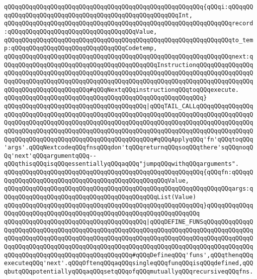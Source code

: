 \verb|qQQqqQQqqQQqqQQqqQQqqQQqqQQqqQQqqQQqqQQqqQQqqQQqqQQqqQQq{qQQqi:qQQqqQQqqQQqqQQqqQQqqQQqqQQqqQQqqQQqqQQqqQQqqQQqqQQqqQQqInt,|\newline
\verb|qQQqqQQqqQQqqQQqqQQqqQQqqQQqqQQqqQQqqQQqqQQqqQQqqQQqqQQqqQQqqQQqrecord:qQQqqQQqqQQqqQQqqQQqqQQqqQQqqQQqqQQqValue,|\newline
\verb|qQQqqQQqqQQqqQQqqQQqqQQqqQQqqQQqqQQqqQQqqQQqqQQqqQQqqQQqqQQqqQQqto_temp:qQQqqQQqqQQqqQQqqQQqqQQqqQQqqQQqCodetemp,|\newline
\verb|qQQqqQQqqQQqqQQqqQQqqQQqqQQqqQQqqQQqqQQqqQQqqQQqqQQqqQQqqQQqqQQqnext:qQQqqQQqqQQqqQQqqQQqqQQqqQQqqQQqqQQqqQQqqQQqInstructionqQQqqQQqqQQqqQQqqQQqqQQqqQQqqQQqqQQqqQQqqQQqqQQqqQQqqQQqqQQqqQQqqQQqqQQqqQQqqQQqqQQqqQQqqQQqqQQqqQQqqQQqqQQqqQQqqQQqqQQqqQQqqQQqqQQqqQQqqQQqqQQqqQQqqQQqqQQqqQQqqQQqqQQqqQQqqQQqqQQq#qQQqNextqQQqinstructionqQQqtoqQQqexecute.|\newline
\verb|qQQqqQQqqQQqqQQqqQQqqQQqqQQqqQQqqQQqqQQqqQQqqQQqqQQqqQQq}|\newline
\newline
\verb|qQQqqQQqqQQqqQQqqQQqqQQqqQQqqQQqqQQqqQQq|\verb#|qQQqTAIL_CALLqQQqqQQqqQQqqQQqqQQqqQQqqQQqqQQqqQQqqQQqqQQqqQQqqQQqqQQqqQQqqQQqqQQqqQQqqQQqqQQqqQQqqQQqqQQqqQQqqQQqqQQqqQQqqQQqqQQqqQQqqQQqqQQqqQQqqQQqqQQqqQQqqQQqqQQqqQQqqQQqqQQqqQQqqQQqqQQqqQQqqQQqqQQqqQQqqQQqqQQqqQQqqQQqqQQqqQQqqQQqqQQqqQQqqQQqqQQqqQQqqQQqqQQqqQQqqQQqqQQqqQQqqQQq#\verb|#qQQqApplyqQQq'fn'qQQqtoqQQq'args'.qQQqNextcodeqQQqfnsqQQqdon'tqQQqreturnqQQqsoqQQqthere'sqQQqnoqQQq'next'qQQqargumentqQQq--qQQqthisqQQqisqQQqessentiallyqQQqaqQQq"jumpqQQqwithqQQqarguments".|\newline
\verb|qQQqqQQqqQQqqQQqqQQqqQQqqQQqqQQqqQQqqQQqqQQqqQQqqQQqqQQq{qQQqfn:qQQqqQQqqQQqqQQqqQQqqQQqqQQqqQQqqQQqqQQqqQQqqQQqqQQqValue,|\newline
\verb|qQQqqQQqqQQqqQQqqQQqqQQqqQQqqQQqqQQqqQQqqQQqqQQqqQQqqQQqqQQqqQQqargs:qQQqqQQqqQQqqQQqqQQqqQQqqQQqqQQqqQQqqQQqqQQqList(Value)|\newline
\verb|qQQqqQQqqQQqqQQqqQQqqQQqqQQqqQQqqQQqqQQqqQQqqQQqqQQqqQQq}qQQqqQQqqQQqqQQqqQQqqQQqqQQqqQQqqQQqqQQqqQQqqQQqqQQqqQQqqQQqqQQqqQQq|\newline
\newline
\verb|qQQqqQQqqQQqqQQqqQQqqQQqqQQqqQQqqQQqqQQq|\verb#|qQQqDEFINE_FUNSqQQqqQQqqQQqqQQqqQQqqQQqqQQqqQQqqQQqqQQqqQQqqQQqqQQqqQQqqQQqqQQqqQQqqQQqqQQqqQQqqQQqqQQqqQQqqQQqqQQqqQQqqQQqqQQqqQQqqQQqqQQqqQQqqQQqqQQqqQQqqQQqqQQqqQQqqQQqqQQqqQQqqQQqqQQqqQQqqQQqqQQqqQQqqQQqqQQqqQQqqQQqqQQqqQQqqQQqqQQqqQQqqQQqqQQqqQQqqQQqqQQqqQQqqQQqqQQqqQQq#\verb|#qQQqDefineqQQq'funs',qQQqthenqQQqexecuteqQQq'next'.qQQqOftenqQQqaqQQqsingleqQQqfunqQQqisqQQqdefined,qQQqbutqQQqpotentiallyqQQqaqQQqsetqQQqofqQQqmutuallyqQQqrecursiveqQQqfns.|\newline
